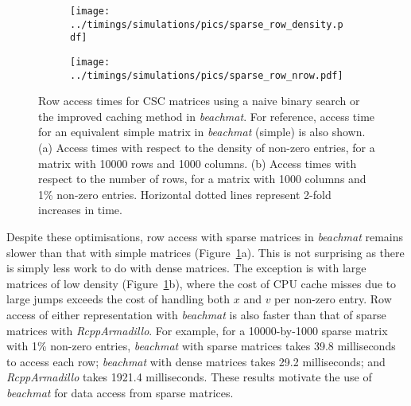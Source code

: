 \documentclass[10pt,letterpaper]{article}
\newcommand{\beachmat}{\textit{beachmat}}
\begin{document}

\begin{figure}[btp]
    \begin{subfigure}[b]{0.49\textwidth}
        \texttt{[image: ../timings/simulations/pics/sparse\_row\_density.pdf]}
        \caption{}
    \end{subfigure}
    \begin{subfigure}[b]{0.49\textwidth}
        \texttt{[image: ../timings/simulations/pics/sparse\_row\_nrow.pdf]}
        \caption{}
    \end{subfigure}
    \caption{Row access times for CSC matrices using a naive binary search or the improved caching method in \beachmat{}.
        For reference, access time for an equivalent simple matrix in \beachmat{} (simple) is also shown.
        (a) Access times with respect to the density of non-zero entries, for a matrix with 10000 rows and 1000 columns.
        (b) Access times with respect to the number of rows, for a matrix with 1000 columns and 1\% non-zero entries.
        Horizontal dotted lines represent 2-fold increases in time.
    }
    \label{fig:sparserow}
\end{figure}


Despite these optimisations, row access with sparse matrices in \beachmat{} remains slower than that with simple matrices (Figure~\ref{fig:sparserow}a).
This is not surprising as there is simply less work to do with dense matrices.
The exception is with large matrices of low density (Figure~\ref{fig:sparserow}b), where the cost of CPU cache misses due to large jumps exceeds the cost of handling both $x$ and $v$ per non-zero entry.
Row access of either representation with \beachmat{} is also faster than that of sparse matrices with \textit{RcppArmadillo}.
For example, for a 10000-by-1000 sparse matrix with 1\% non-zero entries, \beachmat{} with sparse matrices takes 39.8 milliseconds to access each row; \beachmat{} with dense matrices takes 29.2 milliseconds; and \textit{RcppArmadillo} takes 1921.4 milliseconds.
These results motivate the use of \beachmat{} for data access from sparse matrices.
\end{document}
